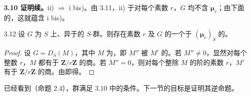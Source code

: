 \textbf{3.10 证明续。}ii) $\Rightarrow$ i bis)。由 3.11，ii) 于对每个素数 $r$，$G$ 均不含 $\boldsymbol\mu_r$；由下面的，这就蕴含 i bis)。
\begin{SGAresult}{}{3.12}
设 $G$ 为 $S$ 上、异于的 $S$-群。则存在素数 $r$ 及 $G$ 的一个于 $(\boldsymbol\mu_r)_S$ 的。
\end{SGAresult}
\begin{proof}
设 $G=D_S(M)$，其中 $M$ 为，即 $M''$ 被 $M'$ 的。若 $M''\ne0$，显然对每个整数 $r$，$M$ 都有于 $\mathbf Z/r\mathbf Z$ 的商。若 $M''=0$，则对每个整除 $M$ 的阶的素数 $r$，$M'$ 有于 $\mathbf Z/r\mathbf Z$ 的商。由即得。
\end{proof}
已经看到（命题 2.4），群满足 3.10 中的条件。下一节的目标是证明其逆命题。

